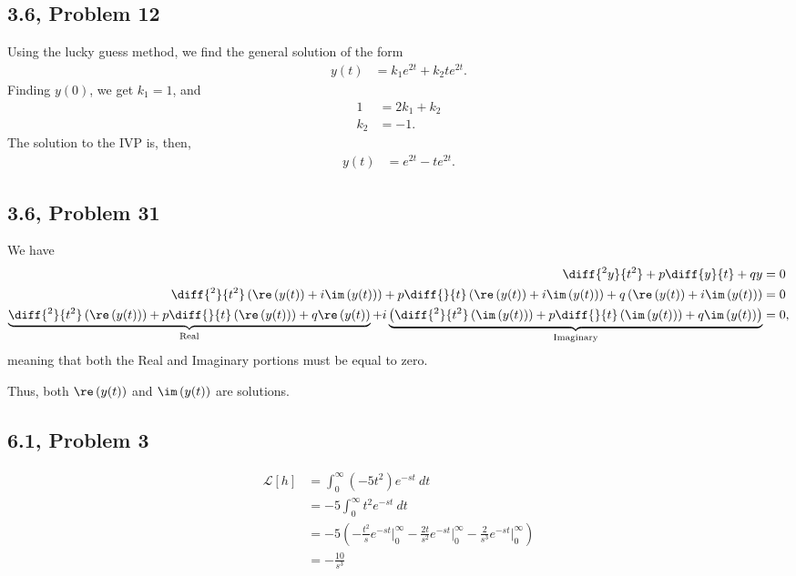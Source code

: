 \documentclass[8pt]{mypackage}
\begin{document}
\subsection{3.6, Problem 12}%
Using the lucky guess method, we find the general solution of the form
\begin{align*}
  y(t) &= k_1e^{2t} + k_2te^{2t}.
\end{align*}
Finding $y(0)$, we get $k_1 = 1$, and
\begin{align*}
  1 &= 2k_1 + k_2\\
  k_2 &= -1.
\end{align*}
The solution to the IVP is, then,
\begin{align*}
  y(t) &= e^{2t} - te^{2t}.
\end{align*}

\subsection{3.6, Problem 31}%
We have
\begin{align*}
  \diff{^2y}{t^2} + p\diff{y}{t} + qy &= 0\\
  \diff{^2}{t^2}\left(\re\left(y(t)\right) + i\im\left(y(t)\right)\right) + p\diff{}{t}\left(\re\left(y(t)\right) + i\im\left(y(t)\right)\right) + q\left(\re\left(y(t)\right) + i\im\left(y(t)\right)\right) &= 0\\
  \underbrace{\diff{^2}{t^2}\left(\re\left(y(t)\right)\right) + p\diff{}{t}\left(\re\left(y(t)\right)\right) + q\re\left(y(t)\right)}_{\text{Real}} + i\underbrace{\left(\diff{^2}{t^2}\left(\im\left(y(t)\right)\right) + p\diff{}{t}\left(\im\left(y(t)\right)\right) + q\im\left(y(t)\right)\right)}_{\text{Imaginary}} &= 0,
\end{align*}
meaning that both the Real and Imaginary portions must be equal to zero.\newline

Thus, both $\re\left(y(t)\right)$ and $\im\left(y(t)\right)$ are solutions.
\subsection{6.1, Problem 3}%
\begin{align*}
  \mathcal{L}\left[h\right] &= \int_{0}^{\infty} \left(-5t^2\right)e^{-st}\:dt\\
                            &= -5\int_{0}^{\infty} t^2e^{-st}\:dt\\
                            &= -5\left(-\frac{t^2}{s}e^{-st}\Bigr\vert_{0}^{\infty} - \frac{2t}{s^2}e^{-st}\Bigr\vert_{0}^{\infty} - \frac{2}{s^3}e^{-st}\Bigr\vert_{0}^{\infty}\right)\\
                            &= -\frac{10}{s^3}
\end{align*}
\end{document}
